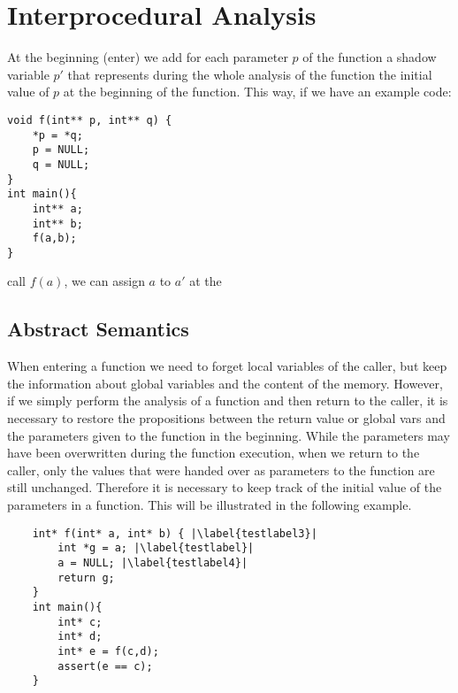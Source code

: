 \section{Interprocedural Analysis}

At the beginning (enter) we add for each parameter $p$ of the function a
shadow variable $p'$ that represents during the whole analysis of the function
the initial value of $p$ at the beginning of the function.
This way, if we have an example code:

\begin{verbatim}
void f(int** p, int** q) {
    *p = *q;
    p = NULL;
    q = NULL;
}
int main(){
    int** a;
    int** b;
    f(a,b);
}
\end{verbatim}

call $f(a)$, we can assign $a$ to $a'$ at the

\subsection{Abstract Semantics}

When entering a function we need to forget local variables of the caller, but keep the information about
global variables and the content of the memory.
However, if we simply perform the analysis of a function and then return to the caller,
it is necessary to restore the propositions between the return value or global vars and
the parameters given to the function in the beginning.
While the parameters may have been overwritten during the function execution,
when we return to the caller, only the values that were handed over as parameters to the
function are still unchanged.
Therefore it is necessary to keep track of the initial value of the parameters in a function.
This will be illustrated in the following example.

\begin{verbatim}
    int* f(int* a, int* b) { |\label{testlabel3}|
        int *g = a; |\label{testlabel}|
        a = NULL; |\label{testlabel4}|
        return g;
    }
    int main(){
        int* c;
        int* d;
        int* e = f(c,d);
        assert(e == c);
    }
\end{verbatim}

